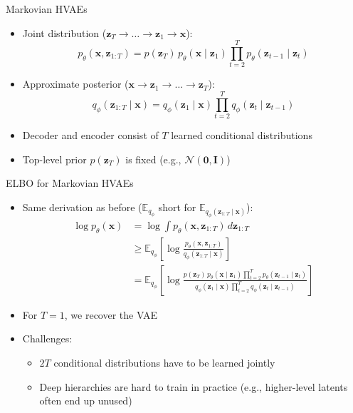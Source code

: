 \documentclass[11pt,compress,t,notes=noshow, xcolor=table]{beamer}
\providecommand{\bx}{\mathbf{x}}
\providecommand{\bz}{\mathbf{z}}
\begin{document}
\begin{frame}{Markovian HVAEs}

\vfill

\begin{itemize}
\item Joint distribution ($\bz_T \to \dots \to \bz_1 \to \bx$):
\begin{equation*}
p_\theta(\bx, \bz_{1:T}) = p(\bz_T)\, p_\theta(\bx \mid \bz_1) \prod_{t=2}^{T} p_\theta(\bz_{t-1} \mid \bz_t)
\end{equation*}
\item Approximate posterior ($\bx \to \bz_1 \to \dots \to \bz_T$):
\begin{equation*}
q_\phi(\bz_{1:T} \mid \bx) = q_\phi(\bz_1 \mid \bx) \prod_{t=2}^{T} q_\phi(\bz_t \mid \bz_{t-1})
\end{equation*}
\item Decoder and encoder consist of $T$ learned conditional distributions
\item Top-level prior $p(\bz_T)$ is fixed (e.g., $\mathcal{N}(\mathbf{0}, \mathbf{I})$)
\end{itemize}

\vfill

\end{frame}


\begin{frame}{ELBO for Markovian HVAEs}

\vfill

\begin{itemize}
\item Same derivation as before ($\mathbb{E}_{q_\phi}$ short for $\mathbb{E}_{q_\phi(\bz_{1:T} \mid \bx)}$):
\begin{align*}
\log p_\theta(\bx) &= \log \int p_\theta(\bx, \bz_{1:T})\, d\bz_{1:T}\\
&\geq \mathbb{E}_{q_\phi}\left[\log \frac{p_\theta(\bx, \bz_{1:T})}{q_\phi(\bz_{1:T} \mid \bx)}\right]\\
&= \mathbb{E}_{q_\phi}\left[\log \frac{p(\bz_T)\, p_\theta(\bx \mid \bz_1) \prod_{t=2}^{T} p_\theta(\bz_{t-1} \mid \bz_t)}{q_\phi(\bz_1 \mid \bx) \prod_{t=2}^{T} q_\phi(\bz_t \mid \bz_{t-1})}\right]
\end{align*}\item For $T = 1$, we recover the VAE
\item Challenges: 
\begin{itemize}
\item $2T$ conditional distributions have to be learned jointly
\item Deep hierarchies are hard to train in practice (e.g., higher-level latents often end up unused)
\end{itemize}

\end{itemize}

\vfill

\end{frame}
\end{document}
